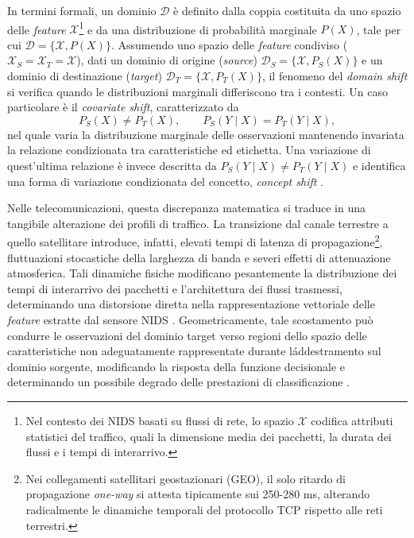 In termini formali, un dominio $\mathcal{D}$ è definito dalla coppia costituita da uno spazio delle \textit{feature} $\mathcal{X}$\footnote{Nel contesto dei NIDS basati su flussi di rete, lo spazio $\mathcal{X}$ codifica attributi statistici del traffico, quali la dimensione media dei pacchetti, la durata dei flussi e i tempi di interarrivo.} e da una distribuzione di probabilità marginale $P(X)$, tale per cui $\mathcal{D}=\{\mathcal{X},P(X)\}$. 
Assumendo uno spazio delle \textit{feature} condiviso ($\mathcal{X}_S=\mathcal{X}_T=\mathcal{X}$), dati un dominio di origine (\textit{source}) $\mathcal{D}_S=\{\mathcal{X},P_S(X)\}$ e un dominio di destinazione (\textit{target}) $\mathcal{D}_T=\{\mathcal{X},P_T(X)\}$, il fenomeno del \textit{domain shift} si verifica quando le distribuzioni marginali differiscono tra i contesti.
Un caso particolare è il \textit{covariate shift}, caratterizzato da
\[ P_S(X)\neq P_T(X), \qquad P_S(Y\mid X)=P_T(Y\mid X), \]
nel quale varia la distribuzione marginale delle osservazioni mantenendo invariata la relazione condizionata tra caratteristiche ed etichetta. 
Una variazione di quest'ultima relazione è invece descritta da
$P_S(Y\mid X)\neq P_T(Y\mid X)$
e identifica una forma di variazione condizionata del concetto, \textit{concept shift} \cite{pan2010}.

Nelle telecomunicazioni, questa discrepanza matematica si traduce in una tangibile alterazione dei profili di traffico. 
La transizione dal canale terrestre a quello satellitare introduce, infatti, elevati tempi di latenza di propagazione\footnote{Nei collegamenti satellitari geostazionari (GEO), il solo ritardo di propagazione \textit{one-way} si attesta tipicamente sui 250-280 ms, alterando radicalmente le dinamiche temporali del protocollo TCP rispetto alle reti terrestri.}, fluttuazioni stocastiche della larghezza di banda e severi effetti di attenuazione atmosferica. 
Tali dinamiche fisiche modificano pesantemente la distribuzione dei tempi di interarrivo dei pacchetti e l'architettura dei flussi trasmessi, determinando una distorsione diretta nella rappresentazione vettoriale delle \textit{feature} estratte dal sensore NIDS \cite{kodheli2021, azar2023}. 
Geometricamente, tale scostamento può condurre le osservazioni del dominio target verso regioni dello spazio delle caratteristiche non adeguatamente rappresentate durante l\'addestramento sul dominio sorgente, modificando la risposta della funzione decisionale e determinando un possibile degrado delle prestazioni di classificazione \cite{farahani2021}.

